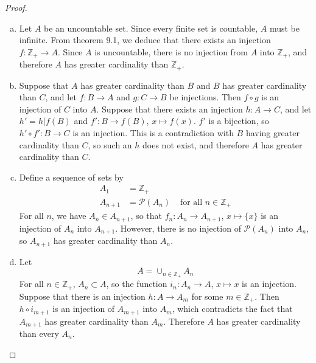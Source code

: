 \documentclass[11pt,a4paper,twoside]{article}
\theoremstyle{definition}
\begin{document}
\begin{proof}\hfill

  \begin{enumerate}[(a)]

  \item Let $A$ be an uncountable set. Since every finite set is countable, $A$ must be infinite.
    From theorem 9.1, we deduce that there exists an injection $f : \mathbb{Z}_+ \to A$.
    Since $A$ is uncountable, there is no injection from $A$ into $\mathbb{Z}_+$,
    and therefore $A$ has greater cardinality than $\mathbb{Z}_+$.

  \item Suppose that $A$ has greater cardinality than $B$ and $B$ has greater cardinality than $C$,
    and let $f : B \to A$ and $g : C \to B$ be injections. Then $f \circ g$ is an injection of $C$ into $A$.
    Suppose that there exists an injection $h : A \to C$, and let $h' = h | f ( B )$ and $f' : B \to f ( B )$, $x \mapsto f (x)$.
    $f'$ is a bijection, so $h' \circ f' : B \to C$ is an injection. This is a contradiction with $B$ having greater cardinality than $C$,
    so such an $h$ does not exist, and therefore $A$ has greater cardinality than $C$.

  \item Define a sequence of sets by
    \begin{align*}
      A_1 &= \mathbb{Z}_+ \\
      A_{n + 1} &= \mathscr{P} ( A_n ) &\text{ for all } n \in \mathbb{Z}_+
    \end{align*}
    For all $n$, we have $A_n \in A_{n + 1}$, so that $f_n : A_n \to A_{n + 1}$, $x \mapsto \{ x \}$ is an injection of $A_n$ into $A_{n + 1}$.
    However, there is no injection of $\mathscr{P} ( A_n )$ into $A_n$, so $A_{n + 1}$ has greater cardinality than $A_n$.

    \item Let
    \begin{equation*}
      A = \cup_{n \in \mathbb{Z}_+} A_n
    \end{equation*}
    For all $n \in \mathbb{Z}_+$, $A_n \subset A$, so the function $i_n : A_n \to A$, $x \mapsto x$ is an injection.
    Suppose that there is an injection $h : A \to A_m$ for some $m \in \mathbb{Z}_+$. Then $h \circ i_{m + 1}$ is an injection
    of $A_{m + 1}$ into $A_m$, which contradicts the fact that $A_{m + 1}$ has greater cardinality than $A_m$.
    Therefore $A$ has greater cardinality than every $A_n$.

  \end{enumerate}

\end{proof}
\end{document}

